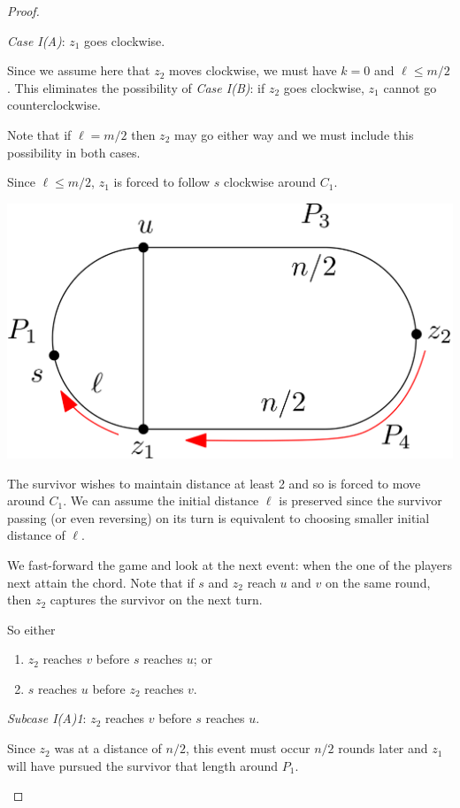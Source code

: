 \documentclass[letterpaper, 10pt]{article}
\begin{document}
\begin{proof}
\begin{proofpart}
\emph{Case I(A)}: $z_1$ goes clockwise.

Since we assume here that $z_2$ moves clockwise, we must have $k=0$ and $\ell \leq m/2$.
This eliminates the possibility of \emph{Case I(B)}: if $z_2$ goes clockwise,
$z_1$ cannot go counterclockwise.

Note that if $\ell = m/2$ then $z_2$ may go either way and we must include this
possibility in both cases.

Since $\ell \leq m/2$, $z_1$ is forced to follow $s$ clockwise around $C_1$.

\begin{center}
\includegraphics[scale=0.15]{diagram8}
\end{center}

The survivor wishes to maintain distance at least 2 and so is forced to move around $C_1$. We can assume
the initial distance $\ell$ is preserved since the survivor passing (or even reversing) on its turn
is equivalent to choosing smaller initial distance of $\ell$.

We fast-forward the game and look at the next event: when the one of the players next attain the chord.
Note that if $s$ and $z_2$ reach $u$ and $v$ on the same round, then $z_2$ captures
the survivor on the next turn.

So either
\begin{enumerate}
\item $z_2$ reaches $v$ before $s$ reaches $u$; or
\item $s$ reaches $u$ before $z_2$ reaches $v$.
\end{enumerate}

\emph{Subcase I(A)1}: $z_2$ reaches $v$ before $s$ reaches $u$.

Since $z_2$ was at a distance of $n/2$, this event must occur $n/2$ rounds later and $z_1$ will
have pursued the survivor that length around $P_1$.


\end{proofpart}
\end{proof}
\end{document}
